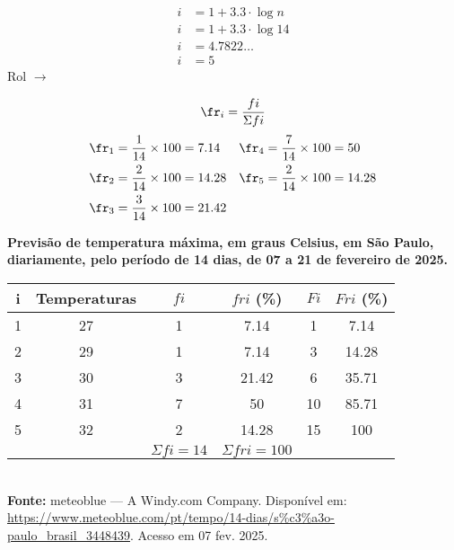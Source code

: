 \begin{align*}
    i &= 1 + 3.3 \cdot \log{n}\\
    i &= 1 + 3.3 \cdot \log{14}\\
    i &= 4.7822\dots\\
    i &= \boxed{5}
\end{align*}
Rol $\rightarrow$ 

\[
    \fr_i = \frac{fi}{\Sigma fi} 
\]
\begin{align*}
    & \fr_1 = \frac{1}{14} \times 100 = 7.14   & & \fr_4 = \frac{7}{14} \times 100 = 50 \\
    & \fr_2 = \frac{2}{14} \times 100 = 14.28  & & \fr_5 = \frac{2}{14} \times 100 = 14.28 \\
    & \fr_3 = \frac{3}{14} \times 100 = 21.42  & &
\end{align*}
\begin{center}
    \textbf{Previsão de temperatura máxima, em graus Celsius, em São Paulo, diariamente, pelo período de 14 dias, de 07 a 21 de fevereiro de 2025.}
    \begin{tabular}{c | c | c | c | c | c}
        \hline
        i & Temperaturas & $fi$ & $fri$ (\%) & $Fi$ & $Fri$ (\%) \\
        \hline
        1 & 27           & 1    & 7.14         & 1    & 7.14  \\
        2 & 29           & 1    & 7.14        & 3    & 14.28  \\
        3 & 30           & 3    & 21.42        & 6    & 35.71  \\
        4 & 31           & 7    & 50           & 10   & 85.71  \\
        5 & 32           & 2    & 14.28        & 15   & 100  \\
        \hline
          &              &  $\Sigma fi = 14 $    & $ \Sigma fri = 100 $            &      & 
    \end{tabular}\\
    \textbf{Fonte:} meteoblue --- A Windy.com Company. Disponível em: \url{https://www.meteoblue.com/pt/tempo/14-dias/s\%c3\%a3o-paulo\_brasil\_3448439}. Acesso em 07 fev. 2025.
\end{center}
